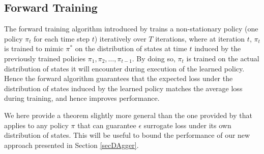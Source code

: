 \documentclass[twoside]{article}
\begin{document}
%
%
\subsection{Forward Training}
The forward training algorithm introduced by \citet{Ross10} trains a non-stationary policy (one policy $\pi_t$ for each time step $t$) iteratively over $T$ iterations, where at iteration $t$, $\pi_t$ is trained to mimic $\pi^*$ on the distribution of states at time $t$ induced by the previously trained policies $\pi_1,\pi_2,\dots,\pi_{t-1}$. By doing so, $\pi_t$ is trained on the actual distribution of states it will encounter during execution of the learned policy. Hence the forward algorithm guarantees that the expected loss under the distribution of states induced by the learned policy matches the average loss during training, and hence improves performance. %

We here provide a theorem slightly more general than the one provided by \citet{Ross10} that applies to any policy $\pi$ that can guarantee $\epsilon$ surrogate loss under its own distribution of states. This will be useful to bound the performance of our new approach presented in Section \ref{secDAgger}.
\end{document}

